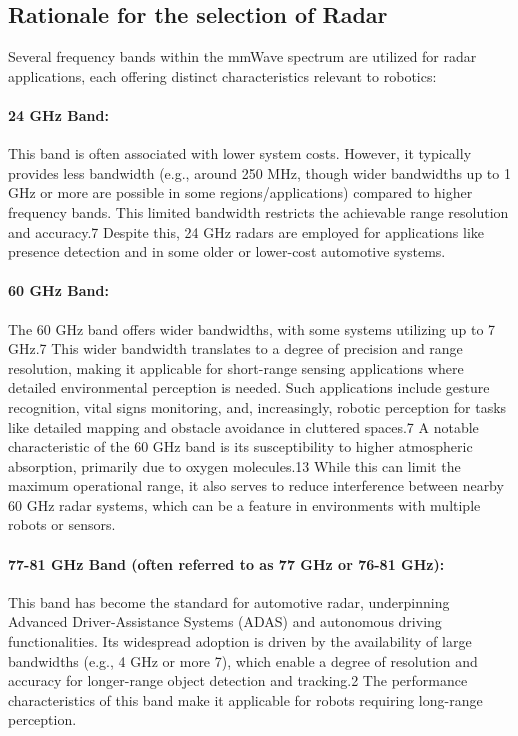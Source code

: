 \subsection{Rationale for the selection of Radar }
Several frequency bands within the mmWave spectrum are utilized for radar applications, each offering distinct characteristics relevant to robotics:

\paragraph{24 GHz Band:} This band is often associated with lower system costs. However, it typically provides less bandwidth (e.g., around 250 MHz, though wider bandwidths up to 1 GHz or more are possible in some regions/applications) compared to higher frequency bands. This limited bandwidth restricts the achievable range resolution and accuracy.7 Despite this, 24 GHz radars are employed for applications like presence detection and in some older or lower-cost automotive systems.

\paragraph{60 GHz Band:} The 60 GHz band offers wider bandwidths, with some systems utilizing up to 7 GHz.7 This wider bandwidth translates to a degree of precision and range resolution, making it applicable for short-range sensing applications where detailed environmental perception is needed. Such applications include gesture recognition, vital signs monitoring, and, increasingly, robotic perception for tasks like detailed mapping and obstacle avoidance in cluttered spaces.7 A notable characteristic of the 60 GHz band is its susceptibility to higher atmospheric absorption, primarily due to oxygen molecules.13 While this can limit the maximum operational range, it also serves to reduce interference between nearby 60 GHz radar systems, which can be a feature in environments with multiple robots or sensors.

\paragraph{77-81 GHz Band (often referred to as 77 GHz or 76-81 GHz):} This band has become the standard for automotive radar, underpinning Advanced Driver-Assistance Systems (ADAS) and autonomous driving functionalities. Its widespread adoption is driven by the availability of large bandwidths (e.g., 4 GHz or more 7), which enable a degree of resolution and accuracy for longer-range object detection and tracking.2 The performance characteristics of this band make it applicable for robots requiring long-range perception.


